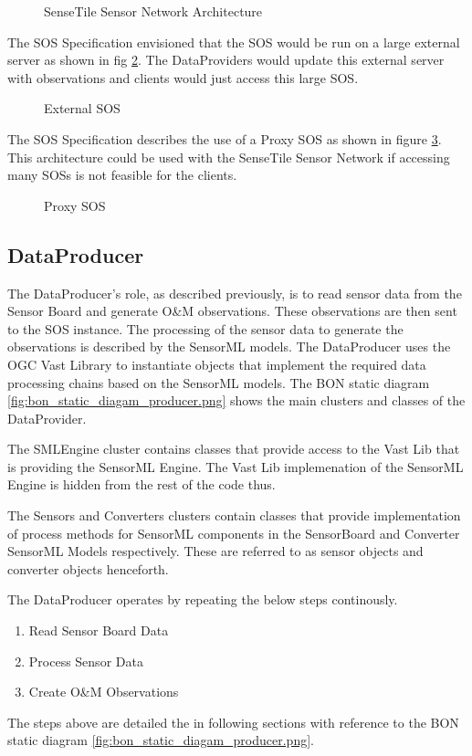 \documentclass[]{final_report}
\begin{document}
\begin{figure}[h]
\caption{SenseTile Sensor Network Architecture}\label{fig:Deployment_network}
\end{figure}
The SOS Specification envisioned that the SOS would be run on a large external server as shown in fig \ref{fig:Deployment_ext_sos}. The DataProviders would update this external server with observations and clients would just access this large SOS.
\begin{figure}[h]
\caption{External SOS}\label{fig:Deployment_ext_sos}
\end{figure}
The SOS Specification describes the use of a Proxy SOS as shown in figure \ref{fig:Deployment_sos_aggr}. This architecture could be used with the SenseTile Sensor Network if accessing many SOSs is not feasible for the clients.
\begin{figure}[h]
\caption{Proxy SOS}\label{fig:Deployment_sos_aggr}
\end{figure}

\newpage
\subsection{DataProducer}
The DataProducer's role, as described previously, is to read sensor data from the Sensor Board and generate O\&M observations. These observations are then sent to the SOS instance. The processing of the sensor data to generate the observations is described by the SensorML models. The DataProducer uses the OGC Vast Library to instantiate objects that implement the required data processing chains based on the SensorML models. The BON static diagram \ref{fig:bon_static_diagam_producer.png}
 shows the main clusters and classes of the DataProvider.

The SMLEngine cluster contains classes that provide access to
the Vast Lib that is providing the SensorML Engine.  The Vast Lib implemenation
of the SensorML Engine is hidden from the rest of the code thus.

The Sensors and Converters clusters contain classes that provide
implementation of process methods for SensorML components in the SensorBoard and
Converter SensorML Models respectively. These are referred to as sensor objects and
converter objects henceforth.

The DataProducer operates by repeating the below steps continously.
 \begin{enumerate}
\item Read Sensor Board Data
\item Process Sensor Data
\item Create O\&M Observations
\end{enumerate}
The steps above are detailed the in following sections with reference
to the BON static diagram \ref{fig:bon_static_diagam_producer.png}.
\end{document}
